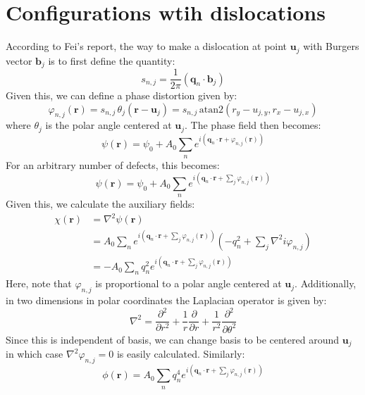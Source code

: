 \documentclass[reqno]{article}
\begin{document}
\section{Configurations wtih dislocations}
According to Fei's report, the way to make a dislocation at point $\mathbf{u}_j$ with Burgers vector $\mathbf{b}_j$ is to first define the quantity:
\begin{equation}
    s_{n, j} = \frac{1}{2\pi} \left(\mathbf{q}_n \cdot \mathbf{b}_j\right)
\end{equation}
Given this, we can define a phase distortion given by:
\begin{equation}
    \varphi_{n, j} \left(\mathbf{r}\right)
    =
    s_{n, j} \, \theta_j \left( \mathbf{r} - \mathbf{u}_j \right)
    = s_{n, j} \, \text{atan2}\left(r_y - u_{j, y}, r_x - u_{j, x}\right)
\end{equation}
where $\theta_j$ is the polar angle centered at $\mathbf{u}_j$.
The phase field then becomes:
\begin{equation}
    \psi(\mathbf{r})
    =
    \psi_0
    + A_0 \sum_n e^{i \left(\mathbf{q}_n \cdot \mathbf{r} + \varphi_{n, j}(\mathbf{r})\right)}
\end{equation}
For an arbitrary number of defects, this becomes:
\begin{equation}
    \psi(\mathbf{r})
    =
    \psi_0
    + A_0 \sum_n e^{i \left(\mathbf{q}_n \cdot \mathbf{r} + \sum_j \varphi_{n, j}(\mathbf{r})\right)}
\end{equation}
Given this, we calculate the auxiliary fields:
\begin{equation}
    \begin{split}
        \chi(\mathbf{r})
        &=
        \nabla^2 \psi(\mathbf{r}) \\
        &=
        A_0 \sum_n e^{i \left(\mathbf{q}_n \cdot \mathbf{r} + \sum_j \varphi_{n, j}(\mathbf{r})\right)}
        \left(-q_n^2 + \sum_j \nabla^2 i \varphi_{n, j}\right) \\
        &= -A_0 \sum_n q_n^2 e^{i \left(\mathbf{q}_n \cdot \mathbf{r} + \sum_j \varphi_{n, j}(\mathbf{r})\right)}
    \end{split}
\end{equation}
Here, note that $\varphi_{n, j}$ is proportional to a polar angle centered at $\mathbf{u}_j$.
Additionally, in two dimensions in polar coordinates the Laplacian operator is given by:
\begin{equation}
    \nabla^2
    =
    \frac{\partial^2}{\partial r^2}
    + \frac{1}{r} \frac{\partial}{\partial r}
    + \frac{1}{r^2} \frac{\partial^2}{\partial \theta^2}
\end{equation}
Since this is independent of basis, we can change basis to be centered around $\mathbf{u}_j$ in which case $\nabla^2 \varphi_{n, j} = 0$ is easily calculated.
Similarly:
\begin{equation}
    \phi(\mathbf{r})
    = A_0 \sum_n q_n^4 e^{i \left(\mathbf{q}_n \cdot \mathbf{r} + \sum_j \varphi_{n, j}(\mathbf{r})\right)}
\end{equation}
\end{document}
